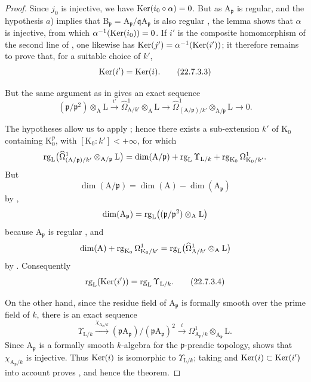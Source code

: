 \begin{proof}
Since $j_0$ is injective, we have $\operatorname{Ker}(i_0\circ\alpha)=0$.
But as $\mathrm{A}_\mathfrak{p}$ is regular, and the hypothesis $a$) implies that $\mathrm{B}_\mathfrak{p}=\mathrm{A}_\mathfrak{p}/\mathfrak{q}\mathrm{A}_\mathfrak{p}$ is also regular , the lemma  shows that $\alpha$ is injective, from which $\alpha^{-1}(\operatorname{Ker}(i_0))=0$.
If $i'$ is the composite homomorphism of the second line of
, one likewise has
$\operatorname{Ker}(j')=\alpha^{-1}(\operatorname{Ker}(i'))$; it therefore remains to prove that, for a
suitable choice of $k'$,
\begin{equation}
\label{0.22.7.3.3}
  \operatorname{Ker}(i')=\operatorname{Ker}(i).
  \tag{22.7.3.3}
\end{equation}

But the same argument as in  gives an exact sequence
\[
  (\mathfrak{p}/\mathfrak{p}^2)\otimes_\mathrm{A}\mathrm{L}
  \xrightarrow{i'}\widehat{\Omega}^1_{\mathrm{A}/k'}
  \otimes_\mathrm{A}\mathrm{L}\longrightarrow
  \widehat{\Omega}^1_{(\mathrm{A}/\mathfrak{p})/k'}
  \otimes_{\mathrm{A}/\mathfrak{p}}\mathrm{L}\longrightarrow 0.
\]

The hypotheses allow us to apply ; hence there exists a
sub-extension $k'$ of $\mathrm{K}_0$ containing $\mathrm{K}_0^p$, with
$[\mathrm{K}_0:k']<+\infty$, for which
\[
  \operatorname{rg}_\mathrm{L}\bigl(
  \widehat{\Omega}^1_{(\mathrm{A}/\mathfrak{p})/k'}
  \otimes_{\mathrm{A}/\mathfrak{p}}\mathrm{L}\bigr)
  =\dim(\mathrm{A}/\mathfrak{p})
  +\operatorname{rg}_\mathrm{L}\Upsilon_{\mathrm{L}/k}
  +\operatorname{rg}_{\mathrm{K}_0}\Omega^1_{\mathrm{K}_0/k'}.
\]
But
\[
  \dim(\mathrm{A}/\mathfrak{p})
  =\dim(\mathrm{A})-\dim(\mathrm{A}_\mathfrak{p})
\]
by ,
\[
  \dim(\mathrm{A}_\mathfrak{p})
  =\operatorname{rg}_\mathrm{L}\bigl((\mathfrak{p}/\mathfrak{p}^2)
  \otimes_\mathrm{A}\mathrm{L}\bigr)
\]
because $\mathrm{A}_\mathfrak{p}$ is regular , and
\[
  \dim(\mathrm{A})+\operatorname{rg}_{\mathrm{K}_0}\Omega^1_{\mathrm{K}_0/k'}
  =\operatorname{rg}_\mathrm{L}\bigl(
  \widehat{\Omega}^1_{\mathrm{A}/k'}\otimes_\mathrm{A}\mathrm{L}\bigr)
\]
by . Consequently
\begin{equation}
\label{0.22.7.3.4}
  \operatorname{rg}_\mathrm{L}(\operatorname{Ker}(i'))=\operatorname{rg}_\mathrm{L}\Upsilon_{\mathrm{L}/k}.
  \tag{22.7.3.4}
\end{equation}

On the other hand, since the residue field of $\mathrm{A}_\mathfrak{p}$ is
formally smooth over the prime field of $k$, there is an exact sequence
\[
  \Upsilon_{\mathrm{L}/k}
  \xrightarrow{\chi_{\mathrm{A}_\mathfrak{p}/k}}
  (\mathfrak{p}\mathrm{A}_\mathfrak{p})/
  (\mathfrak{p}\mathrm{A}_\mathfrak{p})^2
  \xrightarrow{i}\Omega^1_{\mathrm{A}_\mathfrak{p}/k}
  \otimes_{\mathrm{A}_\mathfrak{p}}\mathrm{L}.
\]
Since $\mathrm{A}_\mathfrak{p}$ is a formally smooth $k$-algebra for the
$\mathfrak{p}$-preadic topology,  shows that
$\chi_{\mathrm{A}_\mathfrak{p}/k}$ is injective. Thus $\operatorname{Ker}(i)$ is isomorphic
to $\Upsilon_{\mathrm{L}/k}$; taking  and
$\operatorname{Ker}(i)\subset\operatorname{Ker}(i')$ into account proves , and hence the
theorem.
\end{proof}

